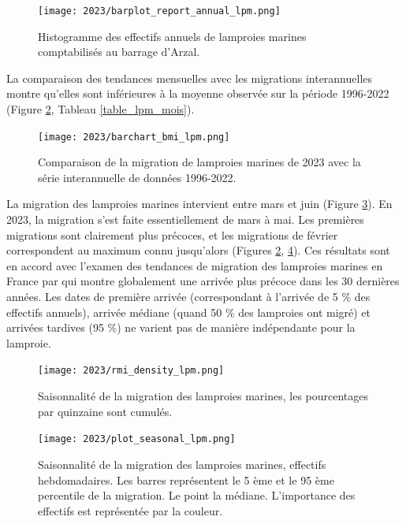 \documentclass[11pt,twocolumn,titlepage,twoside]{article}\usepackage[]{graphicx}\usepackage[]{color}
\begin{document}
		
\begin{figure}[htpb]
\centering
\texttt{[image: 2023/barplot\_report\_annual\_lpm.png]} 
\caption{Histogramme des effectifs annuels de lamproies marines comptabilisés
au barrage d'Arzal.}
\label{barplot_report_annual_lpm}
\end{figure}


La comparaison des tendances mensuelles avec les migrations
interannuelles montre qu'elles sont inférieures à la moyenne observée sur la
période 1996-2022 (Figure \ref{barchart_bmi_lpm}, Tableau
\ref{table_lpm_mois}).

\begin{figure}[htpb]
\centering
\texttt{[image: 2023/barchart\_bmi\_lpm.png]} 
\caption{Comparaison de la migration de lamproies marines de 2023 avec la
série interannuelle de données 1996-2022.}
\label{barchart_bmi_lpm}
\end{figure}





La migration des lamproies marines intervient entre mars et juin (Figure
\ref{rmi_density_lpm}). En 2023, la migration s'est faite essentiellement
de mars à mai. Les premières migrations sont clairement plus précoces, et
les migrations de février correspondent au maximum connu jusqu'alors 
(Figures \ref{barchart_bmi_lpm}, \ref{plot_seasonal_lpm}).
Ces résultats sont en accord avec l'examen des tendances de migration des
lamproies marines en France par \citet{legrandContrastingTrendsSpecies2020} qui
montre globalement une arrivée plus précoce dans les 30 dernières années. 
Les dates de première arrivée (correspondant à l'arrivée de 5 \% des
effectifs annuels), arrivée médiane (quand 50 \% des lamproies ont migré) et
arrivées tardives (95 \%) ne varient pas de manière indépendante pour la
lamproie. 

\begin{figure}[htpb]
\centering
\texttt{[image: 2023/rmi\_density\_lpm.png]} 
\caption{Saisonnalité de la migration des lamproies marines, les pourcentages
par quinzaine sont cumulés.}
\label{rmi_density_lpm}
\end{figure}


\begin{figure}[htpb]
\centering
\texttt{[image: 2023/plot\_seasonal\_lpm.png]} 
\caption{Saisonnalité de la migration des lamproies marines, effectifs
hebdomadaires. Les
barres représentent le 5 ème et le 95 ème percentile de la migration. Le
point la médiane. L'importance des effectifs est représentée par la couleur.}
\label{plot_seasonal_lpm}
\end{figure}
\end{document}
